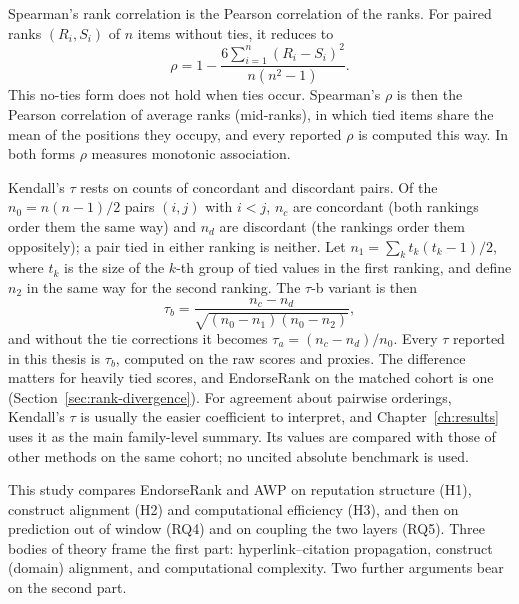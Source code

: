Spearman's rank correlation  is the Pearson correlation of the ranks. For paired ranks $(R_i,S_i)$ of $n$ items without ties, it reduces to
\begin{equation}
\rho = 1 - \frac{6\sum_{i=1}^n (R_i-S_i)^2}{n(n^2-1)}.
\label{eq:spearman}
\end{equation}
This no-ties form does not hold when ties occur. Spearman's $\rho$ is then the Pearson correlation of average ranks (mid-ranks), in which tied items share the mean of the positions they occupy, and every reported $\rho$ is computed this way. In both forms $\rho$ measures monotonic association.

Kendall's $\tau$  rests on counts of concordant and discordant pairs. Of the $n_0=n(n-1)/2$ pairs $(i,j)$ with $i<j$, $n_c$ are concordant (both rankings order them the same way) and $n_d$ are discordant (the rankings order them oppositely); a pair tied in either ranking is neither. Let $n_1=\sum_k t_k(t_k-1)/2$, where $t_k$ is the size of the $k$-th group of tied values in the first ranking, and define $n_2$ in the same way for the second ranking. The $\tau$-b variant is then
\begin{equation}
\tau_b = \frac{n_c - n_d}{\sqrt{(n_0-n_1)(n_0-n_2)}},
\label{eq:kendall}
\end{equation}
and without the tie corrections it becomes $\tau_a=(n_c-n_d)/n_0$. Every $\tau$ reported in this thesis is $\tau_b$, computed on the raw scores and proxies. The difference matters for heavily tied scores, and EndorseRank on the matched cohort is one (Section~\ref{sec:rank-divergence}). For agreement about pairwise orderings, Kendall's $\tau$ is usually the easier coefficient to interpret, and Chapter~\ref{ch:results} uses it as the main family-level summary. Its values are compared with those of other methods on the same cohort; no uncited absolute benchmark is used.


This study compares EndorseRank and AWP on reputation structure (H1), construct alignment (H2) and computational efficiency (H3), and then on prediction out of window (RQ4) and on coupling the two layers (RQ5). Three bodies of theory frame the first part: hyperlink--citation propagation, construct (domain) alignment, and computational complexity. Two further arguments bear on the second part.

